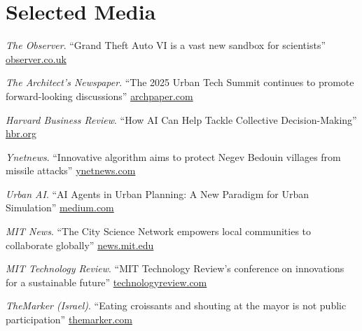 \section*{Selected Media}
\begin{tablist}

    \item[2026] \tab \textit{The Observer}. \enquote{Grand Theft Auto VI is a vast new sandbox for scientists}
    \href{https://observer.co.uk/the-critics/games/article/grand-theft-auto-vi-is-a-vast-new-sandbox-for-scientists}{observer.co.uk}

    \item[2025] \tab \textit{The Architect's Newspaper}. \enquote{The 2025 Urban Tech Summit continues to promote forward-looking discussions}
    \href{https://www.archpaper.com/2025/11/the-2025-urban-tech-summit-continues-to-promote-forward-looking-discussions/}{archpaper.com}

    \item[2025] \tab \textit{Harvard Business Review}. \enquote{How AI Can Help Tackle Collective Decision-Making}
    \href{https://hbr.org/2025/08/how-ai-can-help-tackle-collective-decision-making}{hbr.org}

    \item[2025] \tab \textit{Ynetnews}. \enquote{Innovative algorithm aims to protect Negev Bedouin villages from missile attacks}
    \href{https://www.ynetnews.com/real-estate/article/s1zbwjtyxx}{ynetnews.com}

    \item[2025] \tab \textit{Urban AI}. \enquote{AI Agents in Urban Planning: A New Paradigm for Urban Simulation}
    \href{https://medium.com/urban-ai/ai-agents-in-urban-planning-a-new-paradigm-for-urban-simulation-41c4c210e4a8}{medium.com}

    \item[2023] \tab \textit{MIT News}. \enquote{The City Science Network empowers local communities to collaborate globally}
    \href{https://news.mit.edu/2023/city-science-network-empowers-local-communities-collaborate-globally-1103}{news.mit.edu}

    \item[2023] \tab \textit{MIT Technology Review}. \enquote{MIT Technology Review's conference on innovations for a sustainable future}
    \href{https://event.technologyreview.com/climatetech-2023}{technologyreview.com}

    \item[2021] \tab \textit{TheMarker (Israel)}. \enquote{Eating croissants and shouting at the mayor is not public participation}
    \href{https://www.themarker.com/realestate/.premium-1.9490242}{themarker.com}


\end{tablist}
